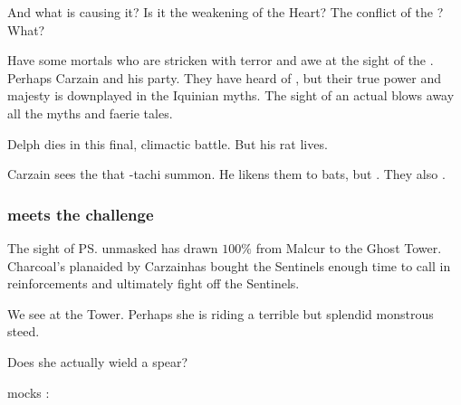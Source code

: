 \begin{garbage}
\begin{prose}
{    And what is causing it?
    Is it the weakening of the Heart?
    The conflict of the \matrices?
    What?}
\end{prose}

Have some mortals who are stricken with terror and awe at the sight of the \dragon{}. 
Perhaps Carzain and his party. 
They have heard  of \dragons, but their true power and majesty is downplayed in the Iquinian myths. 
The sight of an actual \dragon{} blows away all the myths and faerie tales. 

Delph dies in this final, climactic battle. 
But his rat lives.

Carzain sees the \hs{\umbrae} that \Achsah-tachi summon. 
He likens them to bats, but . 
They also . 






\subsubsection{\Achsah{} meets the challenge}
The sight of \ps{\Nzessuacrith}{} unmasked has drawn \Achsah{} $100\%$ from Malcur to the Ghost Tower. 
Charcoal's plan\dash aided by Carzain\dash has bought the Sentinels enough time to call in reinforcements and ultimately fight off the Sentinels. 

We see \Achsah{} at the Tower. 
Perhaps she is riding a terrible but splendid monstrous steed.


Does she actually wield a spear?

\Achsah{} mocks \Nzessuacrith{}: 


\end{garbage}

